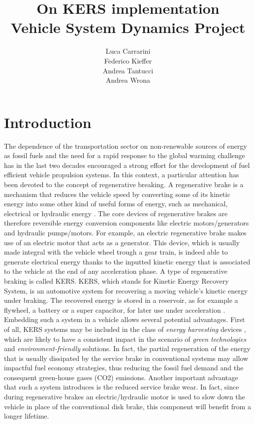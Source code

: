 \documentclass[11pt]{article}
\begin{document}
\title{\textcolor{sapred}{On KERS implementation}\\\small{Vehicle System Dynamics Project}}
\author{Luca Carrarini\\Federico Kieffer\\Andrea Tantucci\\Andrea Wrona}
\maketitle

\thispagestyle{empty}

\tableofcontents
\newpage

\section{Introduction}

The dependence of the transportation sector on non-renewable sources of energy as fossil fuels and the need for a rapid response to the global warming challenge has in the last two decades encouraged a strong effort for the development of fuel efficient vehicle propulsion systems. In this context, a particular attention has been devoted to the concept of regenerative breaking. A regenerative brake is a mechanism that reduces the vehicle speed by converting some of its kinetic energy into some other kind of useful forms of energy, such as mechanical, electrical or hydraulic energy \cite{a}. The core devices of regenerative brakes are therefore reversible energy conversion components like electric motors/generators and hydraulic pumps/motors. For example, an electric regenerative brake makes use of an electric motor that acts as a generator. This device, which is usually made integral with the vehicle wheel trough a gear train, is indeed able to generate electrical energy thanks to the inputted kinetic energy that is associated to the vehicle at the end of any acceleration phase. 
A type of regenerative braking is called KERS. KERS, which stands for Kinetic Energy Recovery System, is an automotive system for recovering a moving vehicle's kinetic energy under braking. The recovered energy is stored in a reservoir, as for example a flywheel, a battery or a super capacitor, for later use under acceleration \cite{b}. 
Embedding such a system in a vehicle allows several potential advantages. First of all, KERS systems may be included in the class of \textit{energy harvesting} devices \cite{c}, which are likely to have a consistent impact in the scenario of \textit{green technologies} and \textit{environment-friendly} solutions. In fact, the partial regeneration of the energy that is usually dissipated by the service brake in conventional systems may allow impactful fuel economy strategies, thus reducing the fossil fuel demand and the consequent green-house gases (CO2) emissions. Another important advantage that such a system introduces is the reduced service brake wear. In fact, since during regenerative brakes an electric/hydraulic motor is used to slow down the vehicle in place of the conventional disk brake, this component will benefit from a longer lifetime. 
\end{document}
